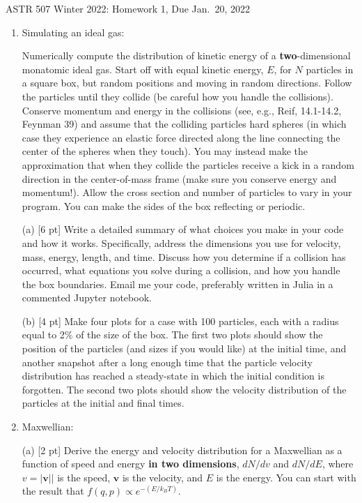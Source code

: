 \documentclass[12pt]{article}
\begin{document}
\noindent ASTR 507 Winter 2022: Homework 1, Due Jan.\ 20, 2022


\begin{enumerate}
\item Simulating an ideal gas:

Numerically compute the distribution of kinetic energy of a {\bf two}-dimensional monatomic ideal gas.  Start off with equal kinetic energy, $E$, for $N$ particles in a square box, but random positions and moving in random directions.  Follow the particles until they collide (be careful how you handle the collisions).  Conserve momentum and energy in the collisions (see, e.g., Reif, 14.1-14.2, Feynman 39) and assume that the colliding particles hard spheres (in which case they experience an elastic force directed along the line connecting the center of the spheres when they touch).   You may instead make the approximation that when they collide the particles receive a kick in a random direction in the center-of-mass frame (make sure you conserve energy and momentum!).  Allow the cross section and number of particles to vary in your program.  You can make the sides of the box reflecting or periodic.

(a) [6 pt] Write a detailed summary of what choices you make in your code and how it works. Specifically, address the dimensions you use for velocity, mass, energy, length, and time.  Discuss how you determine if a collision has occurred, what equations you solve during a collision, and how you handle the box boundaries. Email me your code, preferably written in Julia in a commented Jupyter notebook.

(b) [4 pt] Make four plots for a case with 100 particles, each with a radius equal to 2\% of the size of the box. The first two plots should show the position of the particles (and sizes if you would like) at the initial time, and another snapshot after a long enough time that the particle velocity distribution has reached a steady-state in which the initial condition is forgotten. The second two plots should show the velocity distribution of the particles at the initial and final times.

\item Maxwellian:

(a) [2 pt] Derive the energy and velocity distribution for a Maxwellian as a function 
of speed and energy {\bf in two dimensions}, $dN/dv$ and $dN/dE$, where
$v = \vert \mathbf{v} \vert|$ is the speed, $\mathbf{v}$ is the velocity,
and $E$ is the energy.  You can
start with the result that $f(q,p) \propto e^{-(E/k_BT)}$.


\end{enumerate}
\end{document}
